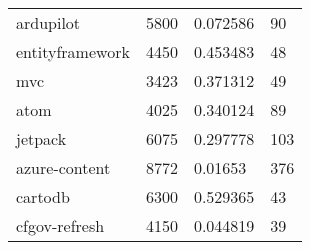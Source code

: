 \begin{table*}[]
\begin{tabular}{llll}
ardupilot                         & 5800                               & 0.072586                                                                                                          & 90                                                                                                            \\
entityframework                      & 4450                               & 0.453483                                                                                                          & 48                                                                                                            \\
mvc                                  & 3423                               & 0.371312                                                                                                          & 49                                                                                                            \\
atom                                   & 4025                               & 0.340124                                                                                                          & 89                                                                                                            \\
jetpack                          & 6075                               & 0.297778                                                                                                          & 103                                                                                                           \\
azure-content                         & 8772                               & 0.01653                                                                                                           & 376                                                                                                           \\
cartodb                             & 6300                               & 0.529365                                                                                                          & 43                                                                                                            \\
cfgov-refresh                          & 4150                               & 0.044819                                                                                                          & 39                                                                                                            \\

\end{tabular}
\end{table*}
